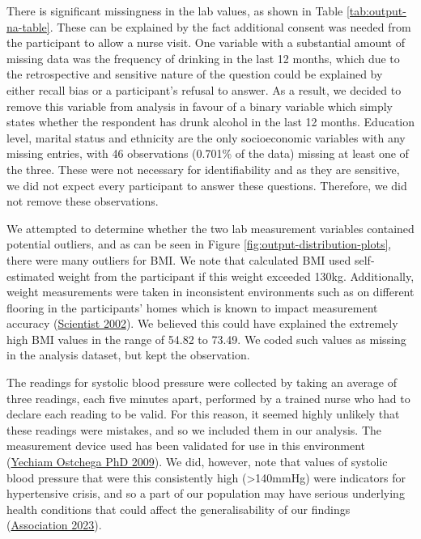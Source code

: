 \documentclass[
  11pt,
  twocolumn]{article}
\begin{document}
There is significant missingness in the lab values, as shown in Table
\ref{tab:output-na-table}. These can be explained by the fact additional
consent was needed from the participant to allow a nurse visit. One
variable with a substantial amount of missing data was the frequency of
drinking in the last 12 months, which due to the retrospective and
sensitive nature of the question could be explained by either recall
bias or a participant's refusal to answer. As a result, we decided to
remove this variable from analysis in favour of a binary variable which
simply states whether the respondent has drunk alcohol in the last 12
months. Education level, marital status and ethnicity are the only
socioeconomic variables with any missing entries, with 46 observations
(0.701\% of the data) missing at least one of the three. These were not
necessary for identifiability and as they are sensitive, we did not
expect every participant to answer these questions. Therefore, we did
not remove these observations.

We attempted to determine whether the two lab measurement variables
contained potential outliers, and as can be seen in Figure
\ref{fig:output-distribution-plots}, there were many outliers for BMI.
We note that calculated BMI used self-estimated weight from the
participant if this weight exceeded 130kg. Additionally, weight
measurements were taken in inconsistent environments such as on
different flooring in the participants' homes which is known to impact
measurement accuracy (\protect\hyperlink{ref-Weight}{Scientist 2002}).
We believed this could have explained the extremely high BMI values in
the range of 54.82 to 73.49. We coded such values as missing in the
analysis dataset, but kept the observation.

The readings for systolic blood pressure were collected by taking an
average of three readings, each five minutes apart, performed by a
trained nurse who had to declare each reading to be valid. For this
reason, it seemed highly unlikely that these readings were mistakes, and
so we included them in our analysis. The measurement device used has
been validated for use in this environment
(\protect\hyperlink{ref-Omron}{Yechiam Ostchega PhD 2009}). We did,
however, note that values of systolic blood pressure that were this
consistently high (\textgreater140mmHg) were indicators for hypertensive
crisis, and so a part of our population may have serious underlying
health conditions that could affect the generalisability of our findings
(\protect\hyperlink{ref-heart}{Association 2023}).
\end{document}
